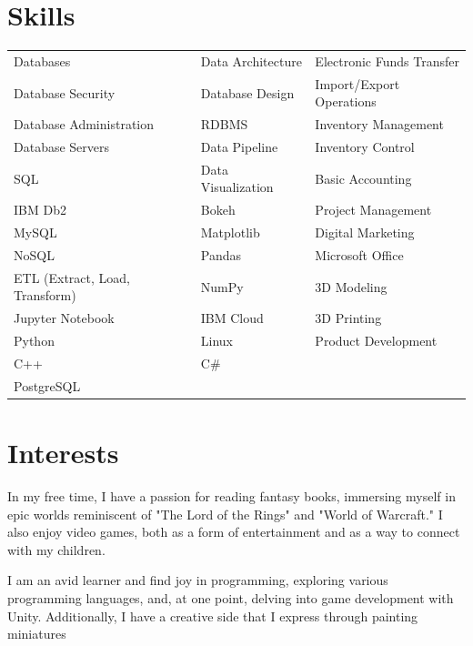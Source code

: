 \documentclass[a4paper,10pt]{article}
\begin{document}
\section*{Skills}
\begin{tabular}{p{4.5cm}p{4.5cm}p{4.5cm}}
    Databases & Data Architecture & Electronic Funds Transfer \\
    Database Security & Database Design & Import/Export Operations \\
    Database Administration & RDBMS & Inventory Management \\
    Database Servers & Data Pipeline & Inventory Control \\
    SQL & Data Visualization & Basic Accounting \\
    IBM Db2 & Bokeh & Project Management \\
    MySQL & Matplotlib & Digital Marketing \\
    NoSQL & Pandas & Microsoft Office \\
    ETL (Extract, Load, Transform) & NumPy & 3D Modeling \\
    Jupyter Notebook & IBM Cloud & 3D Printing \\
    Python & Linux & Product Development \\
    C++ & C\# & \\
    PostgreSQL & & \\
\end{tabular}

\section*{Interests}
In my free time, I have a passion for reading fantasy books, immersing myself in epic worlds reminiscent of "The Lord of the Rings" and "World of Warcraft." I also enjoy video games, both as a form of entertainment and as a way to connect with my children.

I am an avid learner and find joy in programming, exploring various programming languages, and, at one point, delving into game development with Unity. Additionally, I have a creative side that I express through painting miniatures
\end{document}
